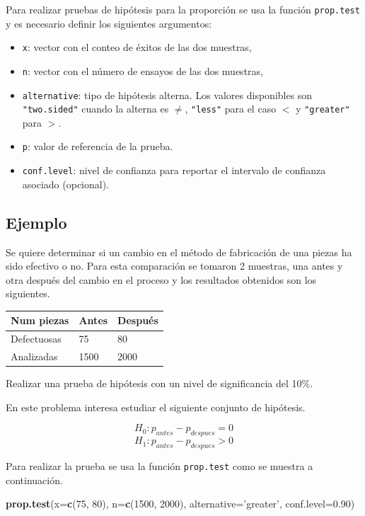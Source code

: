 \documentclass[10pt,]{krantz}
\makeatletter
\newenvironment{Shaded}{\begin{snugshade}}{\end{snugshade}}
\newcommand{\KeywordTok}[1]{\textcolor[rgb]{0.13,0.29,0.53}{\textbf{#1}}}
\newcommand{\DataTypeTok}[1]{\textcolor[rgb]{0.13,0.29,0.53}{#1}}
\newcommand{\DecValTok}[1]{\textcolor[rgb]{0.00,0.00,0.81}{#1}}
\newcommand{\FloatTok}[1]{\textcolor[rgb]{0.00,0.00,0.81}{#1}}
\newcommand{\StringTok}[1]{\textcolor[rgb]{0.31,0.60,0.02}{#1}}
\newcommand{\NormalTok}[1]{#1}
\providecommand{\tightlist}{%
  \setlength{\itemsep}{0pt}\setlength{\parskip}{0pt}}
\newenvironment{kframe}{%
\medskip{}
\setlength{\fboxsep}{.8em}
 \def\at@end@of@kframe{}%
 \ifinner\ifhmode%
  \def\at@end@of@kframe{\end{minipage}}%
  \begin{minipage}{\columnwidth}%
 \fi\fi%
 \def\FrameCommand##1{\hskip\@totalleftmargin \hskip-\fboxsep
 \colorbox{shadecolor}{##1}\hskip-\fboxsep
     \hskip-\linewidth \hskip-\@totalleftmargin \hskip\columnwidth}%
 \MakeFramed {\advance\hsize-\width
   \@totalleftmargin\z@ \linewidth\hsize
   \@setminipage}}%
 {\par\unskip\endMakeFramed%
 \at@end@of@kframe}
\renewenvironment{Shaded}{\begin{kframe}}{\end{kframe}}
\makeatother
\begin{document}
Para realizar pruebas de hipótesis para la proporción se usa la función
\texttt{prop.test} y es necesario definir los siguientes argumentos:

\begin{itemize}
\tightlist
\item
  \texttt{x}: vector con el conteo de éxitos de las dos muestras,
\item
  \texttt{n}: vector con el número de ensayos de las dos muestras,
\item
  \texttt{alternative}: tipo de hipótesis alterna. Los valores
  disponibles son \texttt{"two.sided"} cuando la alterna es \(\neq\),
  \texttt{"less"} para el caso \(<\) y \texttt{"greater"} para \(>\).
\item
  \texttt{p}: valor de referencia de la prueba.
\item
  \texttt{conf.level}: nivel de confianza para reportar el intervalo de
  confianza asociado (opcional).
\end{itemize}

\subsection*{Ejemplo}\label{ejemplo-73}


Se quiere determinar si un cambio en el método de fabricación de una
piezas ha sido efectivo o no. Para esta comparación se tomaron 2
muestras, una antes y otra después del cambio en el proceso y los
resultados obtenidos son los siguientes.

\begin{longtable}[]{@{}lll@{}}
\toprule
Num piezas & Antes & Después\tabularnewline
\midrule
\endhead
Defectuosas & 75 & 80\tabularnewline
Analizadas & 1500 & 2000\tabularnewline
\bottomrule
\end{longtable}

Realizar una prueba de hipótesis con un nivel de significancia del 10\%.

En este problema interesa estudiar el siguiente conjunto de hipótesis.

\[H_0: p_{antes}  - p_{despues} = 0\]
\[H_1: p_{antes}  - p_{despues} > 0\]

Para realizar la prueba se usa la función \texttt{prop.test} como se
muestra a continuación.

\begin{Shaded}
\begin{Highlighting}[]
\KeywordTok{prop.test}\NormalTok{(}\DataTypeTok{x=}\KeywordTok{c}\NormalTok{(}\DecValTok{75}\NormalTok{, }\DecValTok{80}\NormalTok{), }\DataTypeTok{n=}\KeywordTok{c}\NormalTok{(}\DecValTok{1500}\NormalTok{, }\DecValTok{2000}\NormalTok{),}
          \DataTypeTok{alternative=}\StringTok{'greater'}\NormalTok{, }\DataTypeTok{conf.level=}\FloatTok{0.90}\NormalTok{)}
\end{Highlighting}
\end{Shaded}
\end{document}
